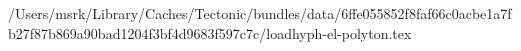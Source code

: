 /Users/msrk/Library/Caches/Tectonic/bundles/data/6ffe055852f8faf66c0acbe1a7fb27f87b869a90bad1204f3bf4d9683f597c7c/loadhyph-el-polyton.tex